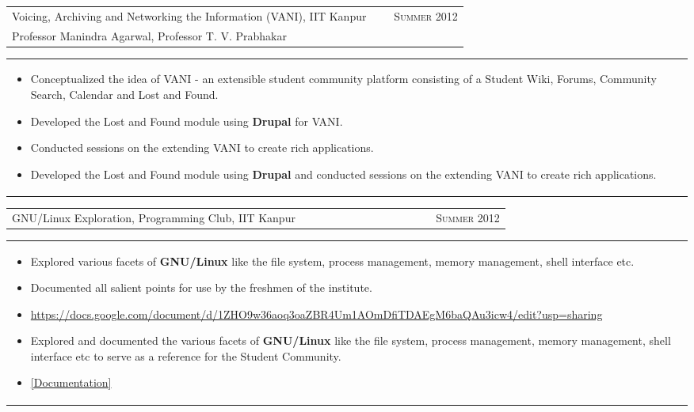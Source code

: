 \documentclass[a4paper,10pt]{article} %
\newcommand{\lproject}[4]{
    \begin{tabular}{p{0.80\linewidth}r}
        \textcolor{NavyBlue}{#2} & \multicolumn{1}{m{4cm}}{\raggedleft \textsc{#1}}\\
        #3
    \end{tabular}
    \begin{tabular}{p{\linewidth}}
    \vspace{-0.3cm}
        \footnotesize{#4}
    \end{tabular}
    \vspace{-0.5cm}
}
\newcommand{\iproject}[3]{
    \begin{tabular}{p{0.85\linewidth}r}
        \textcolor{NavyBlue}{#2} & \multicolumn{1}{m{3cm}}{\raggedleft \textsc{#1}}\\
    \end{tabular}
    \begin{tabular}{p{\linewidth}}
    \vspace{-0.3cm}
        \footnotesize{#3}
    \end{tabular}
    \vspace{-0.5cm}
}
\begin{document}
\lproject {Summer 2012}
          {Voicing, Archiving and Networking the Information \textsc{(VANI)}, IIT Kanpur}
          {Professor Manindra Agarwal, Professor T. V. Prabhakar}
          {
              \begin{itemize}[leftmargin=0.5cm]
                  \item Conceptualized the idea of VANI - an extensible student community platform consisting
                      of a Student Wiki, Forums, Community Search, Calendar and Lost and Found.
                  \item Developed the Lost and Found module using \textbf{Drupal} for VANI.
                  \item Conducted sessions on the extending VANI to create rich applications.
                  \item Developed the Lost and Found module using \textbf{Drupal}
                      and conducted sessions on the extending VANI to create rich applications.
              \end{itemize}
          }

\iproject {Summer 2012}
          {GNU/Linux Exploration, Programming Club, IIT Kanpur}
          {
              \begin{itemize}[leftmargin=0.5cm]
                  \item Explored various facets of \textbf{GNU/Linux} like the file system, process management, memory management,
                      shell interface etc.
                  \item Documented all salient points for use by the freshmen of the institute.
                  \item \href{https://docs.google.com/document/d/1ZHO9w36aoq3oaZBR4Um1AOmDfiTDAEgM6baQAu3icw4/edit?usp=sharing}{https://docs.google.com/document/d/1ZHO9w36aoq3oaZBR4Um1AOmDfiTDAEgM6baQAu3icw4/edit?usp=sharing}
                  \item Explored and documented the various facets of \textbf{GNU/Linux} like the file system, process management, memory management,
                      shell interface etc to serve as a reference for the Student Community.
                  \item
                      \href{https://docs.google.com/document/d/1ZHO9w36aoq3oaZBR4Um1AOmDfiTDAEgM6baQAu3icw4/edit?usp=sharing}{[Documentation]}
              \end{itemize}
          }
\end{document}
